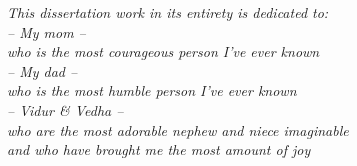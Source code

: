 \vspace*{1cm}
\begin{center}
\emph{This dissertation work in its entirety is dedicated to:\\ -- My mom -- \\ who is the most courageous person I've ever known\\ -- My dad -- \\ who is the most humble person I've ever known\\ -- Vidur \& Vedha -- \\ who are the most adorable nephew and niece imaginable\\ and who have brought me the most amount of joy}
\end{center}
\vspace*{\fill}
